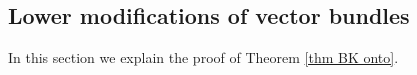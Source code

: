 \documentclass[10pt]{article}
\newcommand{\X}{\mathcal{X}}
\newcommand{\Ee}{\mathcal{E}}
\newcommand{\Z}{\mathbb{Z}}
\newcommand{\C}{\mathbb{C}}
\newcommand{\SL}{\mathrm{SL}}
\newcommand{\Sn}{\mathfrak{S}}
\newcommand{\triv}{\mathrm{triv}}
\newcommand{\sgn}{\mathrm{sgn}}
\theoremstyle{definition}
\theoremstyle{remark}
\newcommand{\rank}{\mathrm{rank}}
\newcommand{\Zur}{Z_{G^\vee}(u)^{\mathrm{red}}}
\newcommand{\std}{\mathrm{std}}
\begin{document}
%
%
%
%
%

%
\subsection{Lower modifications of vector bundles}
\label{subsection Lower modifications of vectors bundles}
In this section we explain the proof of Theorem \ref{thm BK onto}.
\end{document}
